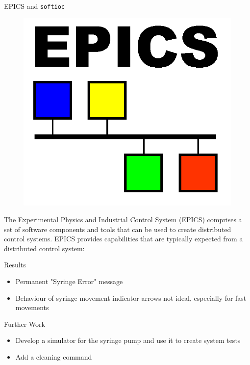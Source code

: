 \documentclass[final,t]{beamer}
\begin{document}
\begin{frame}
\begin{columns}[t]
\begin{column}{.32\linewidth}
      \begin{custombox}{EPICS and \texttt{softioc}}
          \begin{figure}
      \includegraphics[width=\linewidth]{images/epicslogo}
          \end{figure}
      The Experimental Physics and Industrial Control System (EPICS) comprises a set of software components and
      tools that can be used to create distributed control systems. EPICS provides capabilities that are typically expected from a distributed control system:
  \end{custombox}

 
  \begin{custombox}{Results}
    \begin{itemize}
        \item Permanent "Syringe Error" message 
        \item Behaviour of syringe movement indicator arrows not ideal, especially for fast movements 
    \end{itemize}
  \end{custombox}

  \begin{custombox}{Further Work}
    \begin{itemize}
        \item Develop a simulator for the syringe pump and use it to create system tests
        \item Add a cleaning command 
    \end{itemize}
  \end{custombox}
  \end{column}
  \end{columns}
    
\end{frame}
\end{document}
